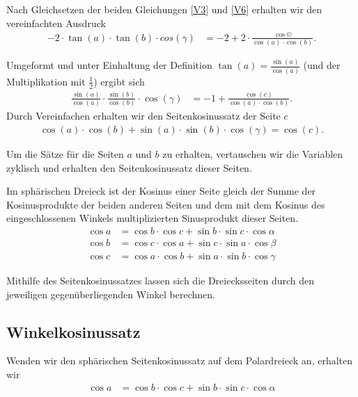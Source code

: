 \begin{refsection}
Nach Gleichsetzen der beiden Gleichungen \eqref{V3} und \eqref{V6}
erhalten wir den vereinfachten Ausdruck
\begin{align*}
-2 \cdot \tan(a) \cdot \tan(b) \cdot cos(\gamma)
&=
-2+2 \cdot \frac{\cos©}{\cos(a) \cdot \cos(b)}.
\end{align*}


Umgeformt und unter Einhaltung der Definition
$\tan(a)=\frac{\sin(a)}{\cos(a)}$ (und der Multiplikation mit
$\frac{1}{2}$) ergibt sich
\begin{align*}
\frac{\sin(a)}{\cos(a)} \cdot \frac{\sin(b)}{\cos(b)} \cdot \cos(\gamma) &= -1 + \frac{\cos(c)}{\cos(a) \cdot \cos(b)}.
\end{align*}
Durch Vereinfachen erhalten wir den Seitenkosinussatz der Seite $c$
\begin{align*}
\cos(a) \cdot \cos(b) + \sin(a) \cdot \sin(b) \cdot \cos(\gamma) = \cos(c) .
\end{align*}

Um die Sätze für die Seiten $a$ und $b$ zu erhalten, vertauschen
wir die Variablen zyklisch und erhalten den Seitenkosinussatz dieser
Seiten.

\begin{satz}
Im sphärischen Dreieck ist der Kosinus einer Seite gleich der Summe
der Kosinusprodukte der beiden anderen Seiten und dem mit dem Kosinus
des eingeschlossenen Winkels multiplizierten Sinusprodukt dieser
Seiten.
\begin{align*}
{\cos a} &= {\cos b} \cdot {\cos c} + {\sin b} \cdot {\sin c} \cdot {\cos \alpha}\\
{\cos b} &= {\cos c} \cdot {\cos a} + {\sin c} \cdot {\sin a} \cdot {\cos \beta}\\
{\cos c} &= {\cos a} \cdot {\cos b} + {\sin a} \cdot {\sin b} \cdot {\cos \gamma}
\end{align*}
\label{skript:kugel:satz:Seitenkosinussatz}
%
\end{satz}

Mithilfe des Seitenkosinussatzes lassen sich die Dreiecksseiten
durch den jeweiligen gegenüberliegenden Winkel berechnen.


\subsection{Winkelkosinussatz}
Wenden wir den sphärischen Seitenkosinussatz auf dem Polardreieck
an, erhalten wir
\begin{align*}
{\cos a} &= {\cos b} \cdot {\cos c} + {\sin b} \cdot {\sin c} \cdot {\cos \alpha}
\end{align*}


\end{refsection}

